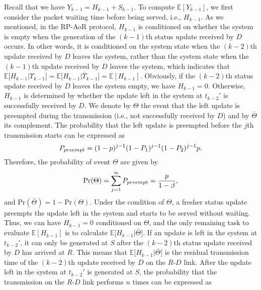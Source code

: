 \documentclass{IEEEtran}
\begin{document}
 

Recall that we have $Y_{k-1}=H_{k-1}+S_{k-1}$. To compute $\mathbb{E}[Y_{k-1}]$, we first consider the packet waiting time before being served, i.e., $H_{k-1}$. As we mentioned, in the RP-AoR protocol, $H_{k-1}$ is conditioned on whether the system is empty when the generation of the $(k-1)$th status update received by $D$ occurs.
In other words, it is conditioned on the system state when the $(k-2)$th update received by $D$ leaves the system, rather than the system state when the $(k-1)$th update received by $D$ leaves the system, which indicates that $\mathbb{E}[H_{k-1}|\Upsilon_{k-1}]=\mathbb{E}\big[H_{k-1}|\bar{\Upsilon}_{k-1}\big]=\mathbb{E}[H_{k-1}]$. Obviously, if the $(k-2)$th status update received by $D$ leaves the system empty, we have $H_{k-1}=0$. Otherwise, $H_{k-1}$ is determined by whether the update left in the system at $t_{k-2}'$ is successfully received by $D$. We denote by $\Theta$ the event that the left update is preempted during the transmission (i.e., not successfully received by $D$) and by $\bar{\Theta}$ its complement. The probability that the left update is preempted before the $j$th transmission starts can be expressed as
\vspace{-0.01cm}
\begin{equation}
P_{preempt}=(1-p)^{j-1}(1-P_1)^{j-1}(1-P_2)^{j-1}p.
\vspace{-0.01cm}
\end{equation}
Therefore, the probability of event $\Theta$ are given by
\vspace{-0.01cm}
\begin{equation}
\mathrm{Pr}(\Theta)=\sum_{j=1}^{\infty}P_{preempt}=\frac{p}{1-\beta},
\vspace{-0.01cm}
\end{equation}
and $\mathrm{Pr}(\bar{\Theta})=1-\mathrm{Pr}(\Theta)$. Under the condition of $\Theta$, a fresher status update preempts the update left in the system and starts to be served without waiting. Thus, we can have $H_{k-1}=0$ conditioned on $\Theta$, and the only remaining task to evaluate $\mathbb{E}[H_{k-1}]$ is to calculate $\mathbb{E}\big[H_{k-1}|\bar{\Theta}\big]$. If an update is left in the system at $t_{k-2}'$, it can only be generated at $S$ after the $(k-2)$th status update received by $D$ has arrived at $R$. This means that $\mathbb{E}\big[H_{k-1}|\bar{\Theta}\big]$ is the residual transmission time of the $(k-2)$th update received by $D$ on the $R$-$D$ link. After the update left in the system at $t_{k-2}'$ is generated at $S$, the probability that the transmission on the $R$-$D$ link performs $n$ times can be expressed as
\end{document}
